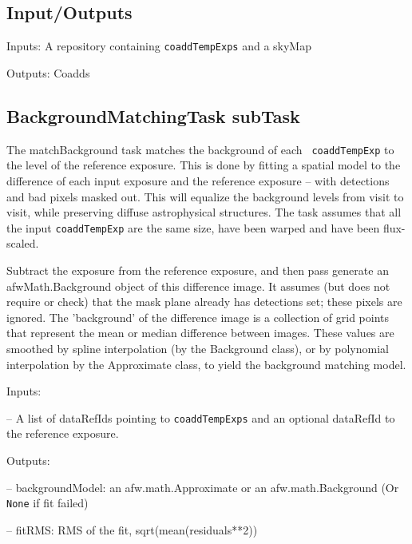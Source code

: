 \documentclass[prd, nofootinbib, floatfix, 11pt,tightenlines,times]{article}
\begin{document}


\subsection{Input/Outputs}

Inputs: A repository containing {\tt coaddTempExps} and a skyMap

Outputs: Coadds

\subsection{BackgroundMatchingTask subTask} 
The matchBackground task matches the background of each {\tt
  coaddTempExp} to the level of the reference exposure.  This is done
by fitting a spatial model to the difference of each input exposure
and the reference exposure -- with detections and bad pixels masked
out.  This will equalize the background levels from visit to visit,
while preserving diffuse astrophysical structures.  The task assumes
that all the input {\tt coaddTempExp} are the same size, have been
warped and have been flux-scaled.

Subtract the exposure from the reference exposure, and then pass
generate an afwMath.Background object of this difference image. It
assumes (but does not require or check) that the mask plane already
has detections set; these pixels are ignored.  The 'background' of the
difference image is a collection of grid points that represent the
mean or median difference between images.  These values are smoothed
by spline interpolation (by the Background class), or by polynomial
interpolation by the Approximate class, to yield the background
matching model.

Inputs: 

-- A list of dataRefIds pointing to {\tt coaddTempExps} and an
optional dataRefId to the reference exposure.

Outputs:  

-- backgroundModel: an afw.math.Approximate or an afw.math.Background (Or {\tt None} if fit failed) 

-- fitRMS: RMS of the fit, sqrt(mean(residuals**2))
\end{document}

